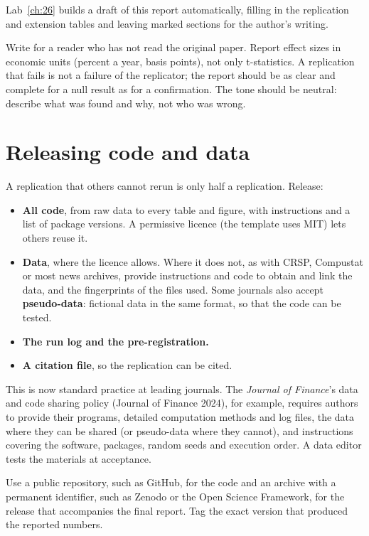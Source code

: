 Lab~\ref{ch:26} builds a draft of this report automatically, filling in the replication and extension tables and leaving marked sections for the author's writing.

Write for a reader who has not read the original paper. Report effect sizes in economic units (percent a year, basis points), not only t-statistics. A replication that fails is not a failure of the replicator; the report should be as clear and complete for a null result as for a confirmation. The tone should be neutral: describe what was found and why, not who was wrong.

\section{Releasing code and data}
\label{sec:26-release}

A replication that others cannot rerun is only half a replication. Release:

\begin{itemize}
  \item \textbf{All code}, from raw data to every table and figure, with instructions and a list of package versions. A permissive licence (the template uses MIT) lets others reuse it.
  \item \textbf{Data}, where the licence allows. Where it does not, as with CRSP, Compustat or most news archives, provide instructions and code to obtain and link the data, and the fingerprints of the files used. Some journals also accept \textbf{pseudo-data}: fictional data in the same format, so that the code can be tested.
  \item \textbf{The run log and the pre-registration.}
  \item \textbf{A citation file}, so the replication can be cited.
\end{itemize}

This is now standard practice at leading journals. The \emph{Journal of Finance}'s data and code sharing policy (Journal of Finance 2024), for example, requires authors to provide their programs, detailed computation methods and log files, the data where they can be shared (or pseudo-data where they cannot), and instructions covering the software, packages, random seeds and execution order. A data editor tests the materials at acceptance.

Use a public repository, such as GitHub, for the code and an archive with a permanent identifier, such as Zenodo or the Open Science Framework, for the release that accompanies the final report. Tag the exact version that produced the reported numbers.

